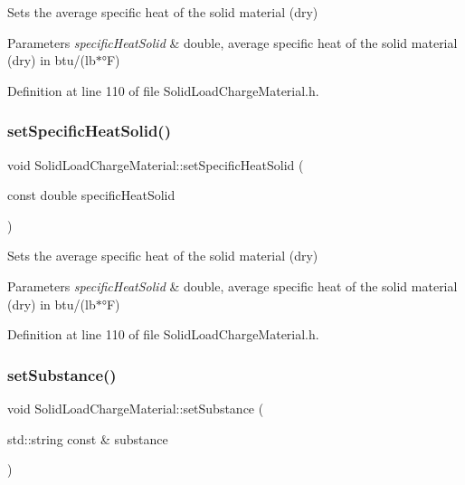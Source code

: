 Sets the average specific heat of the solid material (dry) 
\begin{DoxyParams}{Parameters}
{\em specific\+Heat\+Solid} & double, average specific heat of the solid material (dry) in btu/(lb$\ast$°F) \\
\hline
\end{DoxyParams}


Definition at line 110 of file Solid\+Load\+Charge\+Material.\+h.

\mbox{\label{class_solid_load_charge_material_ad9d2e3668a6a14700f4dced4882f98c0}} 
\subsubsection{\texorpdfstring{set\+Specific\+Heat\+Solid()}{setSpecificHeatSolid()}\hspace{0.1cm}{\footnotesize\ttfamily [3/3]}}
{\footnotesize\ttfamily void Solid\+Load\+Charge\+Material\+::set\+Specific\+Heat\+Solid (\begin{DoxyParamCaption}\item[{const double}]{specific\+Heat\+Solid }\end{DoxyParamCaption})\hspace{0.3cm}{\ttfamily [inline]}}

Sets the average specific heat of the solid material (dry) 
\begin{DoxyParams}{Parameters}
{\em specific\+Heat\+Solid} & double, average specific heat of the solid material (dry) in btu/(lb$\ast$°F) \\
\hline
\end{DoxyParams}


Definition at line 110 of file Solid\+Load\+Charge\+Material.\+h.

\mbox{\label{class_solid_load_charge_material_aebe376ab016f48678c3a70390b4ea52a}} 
\subsubsection{\texorpdfstring{set\+Substance()}{setSubstance()}\hspace{0.1cm}{\footnotesize\ttfamily [1/3]}}
{\footnotesize\ttfamily void Solid\+Load\+Charge\+Material\+::set\+Substance (\begin{DoxyParamCaption}\item[{std\+::string const \&}]{substance }\end{DoxyParamCaption})\hspace{0.3cm}{\ttfamily [inline]}}

